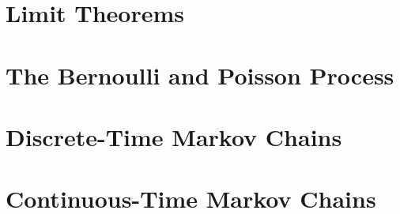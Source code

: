 	\twocolumn
	\chapter{Limit Theorems}

	\chapter{The Bernoulli and Poisson Process}

	\chapter{Discrete-Time Markov Chains}

	\chapter{Continuous-Time Markov Chains}